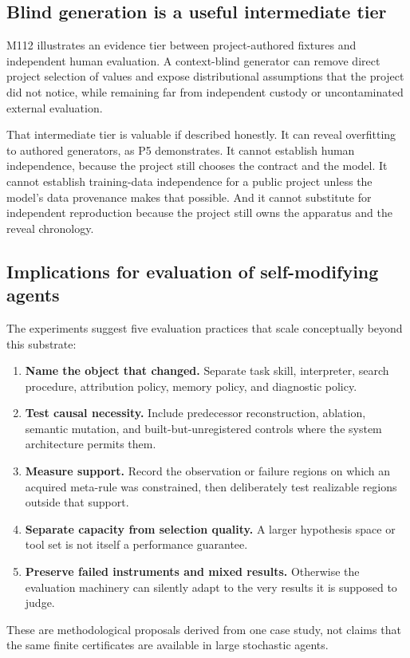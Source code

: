 \subsection{Blind generation is a useful intermediate tier}
M112 illustrates an evidence tier between project-authored fixtures and independent human evaluation. A context-blind generator can remove direct project selection of values and expose distributional assumptions that the project did not notice, while remaining far from independent custody or uncontaminated external evaluation.

That intermediate tier is valuable if described honestly. It can reveal overfitting to authored generators, as P5 demonstrates. It cannot establish human independence, because the project still chooses the contract and the model. It cannot establish training-data independence for a public project unless the model's data provenance makes that possible. And it cannot substitute for independent reproduction because the project still owns the apparatus and the reveal chronology.

\subsection{Implications for evaluation of self-modifying agents}
The experiments suggest five evaluation practices that scale conceptually beyond this substrate:
\begin{enumerate}
  \item \textbf{Name the object that changed.} Separate task skill, interpreter, search procedure, attribution policy, memory policy, and diagnostic policy.
  \item \textbf{Test causal necessity.} Include predecessor reconstruction, ablation, semantic mutation, and built-but-unregistered controls where the system architecture permits them.
  \item \textbf{Measure support.} Record the observation or failure regions on which an acquired meta-rule was constrained, then deliberately test realizable regions outside that support.
  \item \textbf{Separate capacity from selection quality.} A larger hypothesis space or tool set is not itself a performance guarantee.
  \item \textbf{Preserve failed instruments and mixed results.} Otherwise the evaluation machinery can silently adapt to the very results it is supposed to judge.
\end{enumerate}
These are methodological proposals derived from one case study, not claims that the same finite certificates are available in large stochastic agents.


